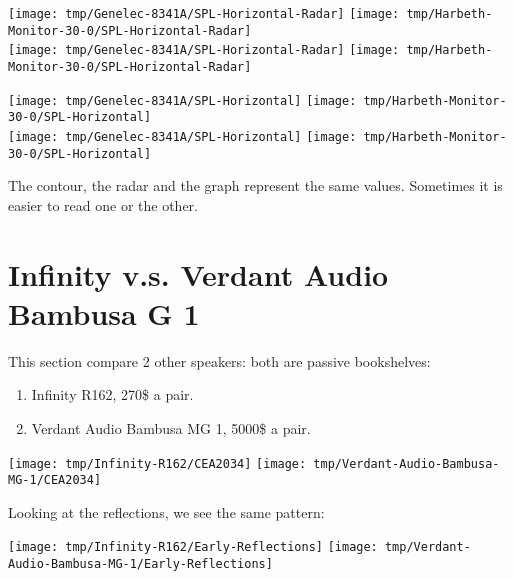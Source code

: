 \documentclass{tufte-book}
\begin{document}
\begin{figure*}[ht]
  \texttt{[image: tmp/Genelec-8341A/SPL-Horizontal-Radar]}
  \texttt{[image: tmp/Harbeth-Monitor-30-0/SPL-Horizontal-Radar]}
  \\\vspace{\baselineskip}
  \texttt{[image: tmp/Genelec-8341A/SPL-Horizontal-Radar]}
  \texttt{[image: tmp/Harbeth-Monitor-30-0/SPL-Horizontal-Radar]}
\end{figure*}

\begin{figure*}[ht]
  \texttt{[image: tmp/Genelec-8341A/SPL-Horizontal]}
  \texttt{[image: tmp/Harbeth-Monitor-30-0/SPL-Horizontal]}
  \\\vspace{\baselineskip}
  \texttt{[image: tmp/Genelec-8341A/SPL-Horizontal]}
  \texttt{[image: tmp/Harbeth-Monitor-30-0/SPL-Horizontal]}
\end{figure*}
The contour, the radar and the graph represent the same values. Sometimes it is easier
to read one or the other.


\section{Infinity v.s. Verdant Audio Bambusa G 1}

This section compare 2 other speakers: both are passive bookshelves:
\begin{enumerate}
\item Infinity R162, 270\$ a pair.
\item Verdant Audio Bambusa MG 1, 5000\$ a pair.
\end{enumerate}

\begin{figure*}[ht]
  \texttt{[image: tmp/Infinity-R162/CEA2034]}
  \texttt{[image: tmp/Verdant-Audio-Bambusa-MG-1/CEA2034]}
\end{figure*}

Looking at the reflections, we see the same pattern:
\begin{figure*}[ht]
  \texttt{[image: tmp/Infinity-R162/Early-Reflections]}
  \texttt{[image: tmp/Verdant-Audio-Bambusa-MG-1/Early-Reflections]}
\end{figure*}
\end{document}
